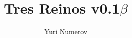 \documentclass{book}
\title{Tres Reinos v0.1$\beta$}
\author{Yuri Numerov}
\date{}
\begin{document}

%
%
%
%

%
%
%
\pagebreak
%
\pagebreak
%
\end{document}
